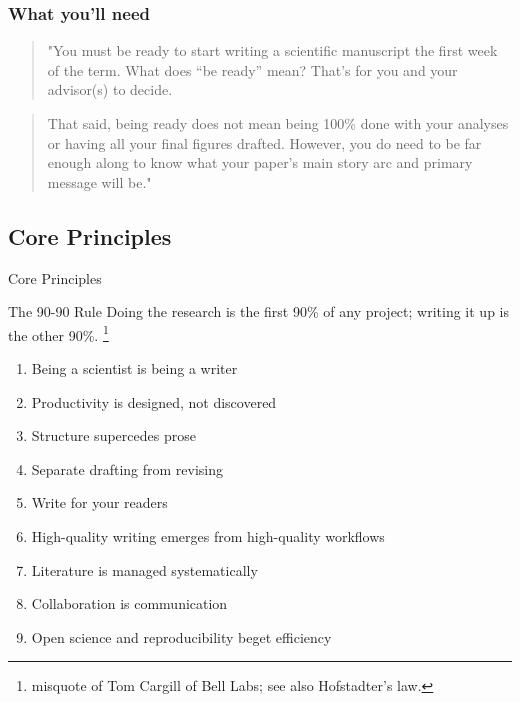 \documentclass{beamer}
\begin{document}

\begin{frame}
    \frametitle{What you'll need}

    \begin{quote}
    "You must be ready to start writing a scientific manuscript the first week of the term. What does “be ready” mean? 
    That’s for you and your advisor(s) to decide. 
    \end{quote}
    \bigskip
    \begin{quote}
    That said, being ready does not mean being 100\% done with your analyses or having all your final figures drafted.  
    However, you do need to be far enough along to know what your paper’s main story arc and primary message will be."
    \end{quote}

\end{frame}



\subsection{Core Principles}

\begin{frame}{Core Principles}

    \begin{block}{The 90-90 Rule}
    Doing the research is the first 90\% of any project; writing it up is the other 90\%.%
    \footnote{misquote of Tom Cargill of Bell Labs; see also Hofstadter's law.}
    \end{block}

    \footnotesize

    \begin{enumerate}
        \item Being a scientist is being a writer
        \item Productivity is designed, not discovered
        \item Structure supercedes prose
        \item Separate drafting from revising
        \item Write for your readers
        \item High-quality writing emerges from high-quality workflows
        \item Literature is managed systematically
        \item Collaboration is communication
        \item Open science and reproducibility beget efficiency
    \end{enumerate}

\end{frame}
\end{document}
